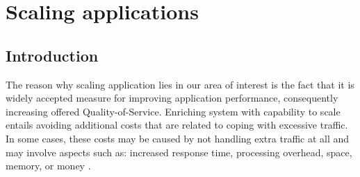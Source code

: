 \chapter{Scaling applications}


\section{Introduction}

The reason why scaling application lies in our area of interest is the fact that it is widely accepted measure for improving application performance, consequently increasing offered Quality-of-Service. Enriching system with capability to scale entails avoiding additional costs that are related to coping with excessive traffic. In some cases, these costs may be caused by not handling extra traffic at all and may involve aspects such as: increased response time, processing overhead, space, memory, or money \cite{Bo00}. 


